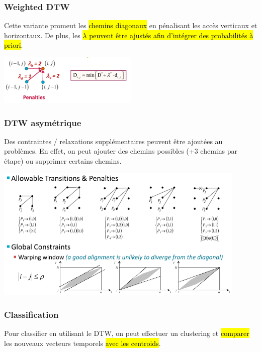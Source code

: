 \documentclass[letterpaper, 12pt]{article}
\newcommand{\alinea}{
\hspace*{0.5cm}}
\begin{document}
			\subsubsection{Weighted DTW}
				\alinea Cette variante promeut les \hl{chemins diagonaux} en pénalisant les accès verticaux et horizontaux.
					De plus, les \hl{$\lambda$ peuvent être ajustés afin d'intégrer des probabilités à priori}.
				\begin{center}
					\includegraphics[width=0.5\textwidth]{Images/dtw3}
				\end{center}
			\subsubsection{DTW asymétrique}
				\alinea Des contraintes / relaxations supplémentaires peuvent être ajoutées au problèmes. En effet, on peut
					ajouter des chemins possibles (+3 chemins par étape) ou supprimer certains chemins.
					\begin{center}
						\includegraphics[width=0.9\textwidth]{Images/dtw4}
					\end{center}
			\subsubsection{Classification}
				\alinea Pour classifier en utilisant le DTW, on peut effectuer un clustering et \hl{comparer} les nouveaux
					vecteurs temporels \hl{avec les centroids}.
\end{document}
